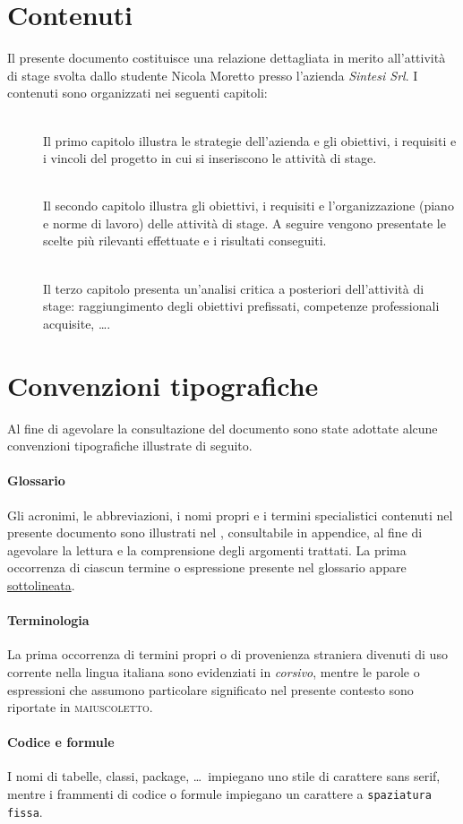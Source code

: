 	\section*{Contenuti}
	\label{ch:tesi:intro:contenuti}
	Il presente documento costituisce una relazione dettagliata in merito all'attività di stage svolta dallo studente Nicola Moretto presso l'azienda \textit{Sintesi Srl}. I contenuti sono organizzati nei seguenti capitoli:
	\begin{description}
	  \item[] \hfill \\
	  Il primo capitolo illustra le strategie dell'azienda e gli obiettivi, i requisiti e i vincoli del progetto in cui si inseriscono le attività di stage.
	  \item[] \hfill \\ 
		Il secondo capitolo illustra gli obiettivi, i requisiti e l'organizzazione (piano e norme di lavoro) delle attività di stage. A seguire vengono presentate le scelte più rilevanti effettuate e i risultati conseguiti.
	  \item[] \hfill \\
		Il terzo capitolo presenta un'analisi critica a posteriori dell'attività di stage: raggiungimento degli obiettivi prefissati, competenze professionali acquisite, \ldots.
	\end{description}

	\section*{Convenzioni tipografiche}
	\label{ch:tesi:intro:convenzioni}
	Al fine di agevolare la consultazione del documento sono state adottate alcune convenzioni tipografiche illustrate di seguito.

	\paragraph{Glossario} Gli acronimi, le abbreviazioni, i nomi propri e i termini specialistici contenuti nel presente documento sono illustrati nel \textit{}, consultabile in appendice, al fine di agevolare la lettura e la comprensione degli argomenti trattati. La prima occorrenza di ciascun termine o espressione presente nel glossario appare \underline{sottolineata}.

	\paragraph{Terminologia} La prima occorrenza di termini propri o di provenienza straniera divenuti di uso corrente nella lingua italiana sono evidenziati in \textit{corsivo}, mentre le parole o espressioni che assumono particolare significato nel presente contesto sono riportate in \textsc{maiuscoletto}.

	\paragraph{Codice e formule} I nomi di tabelle, classi, package, \ldots\ impiegano uno stile di carattere \textsf{sans serif}, mentre i frammenti di codice o formule impiegano un carattere a \texttt{spaziatura fissa}.
\endgroup		

\vfill
